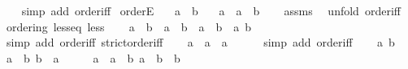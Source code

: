 \begin{isabellebody}
%
\isadelimproof
\ \ %
\endisadelimproof
%
\isatagproof
{}\isamarkupfalse%
\ {\isacharparenleft}{\kern0pt}simp\ add{\isacharcolon}{\kern0pt}\ order{\isacharunderscore}{\kern0pt}iff{\isacharparenright}{\kern0pt}%
\endisatagproof
{\isafoldproof}%
%
\isadelimproof
\isanewline
%
\endisadelimproof
\isanewline
{}\isamarkupfalse%
\ orderE{\isacharcolon}{\kern0pt}\isanewline
\ \ \ {\isachardoublequoteopen}a\ \isactrlbold {\isasymle}\ b{\isachardoublequoteclose}\isanewline
\ \ \ {\isachardoublequoteopen}a\ {\isacharequal}{\kern0pt}\ a\ \isactrlbold {\isacharasterisk}{\kern0pt}\ b{\isachardoublequoteclose}\isanewline
%
\isadelimproof
\ \ %
\endisadelimproof
%
\isatagproof
{}\isamarkupfalse%
\ assms\ \isamarkupfalse%
\ {\isacharparenleft}{\kern0pt}unfold\ order{\isacharunderscore}{\kern0pt}iff{\isacharparenright}{\kern0pt}%
\endisatagproof
{\isafoldproof}%
%
\isadelimproof
\isanewline
%
\endisadelimproof
\isanewline
{}\isamarkupfalse%
\ ordering\ less{\isacharunderscore}{\kern0pt}eq\ less\isanewline
%
\isadelimproof
%
\endisadelimproof
%
\isatagproof
{}\isamarkupfalse%
\isanewline
\ \ \isamarkupfalse%
\ {\isachardoublequoteopen}a\ \isactrlbold {\isacharless}{\kern0pt}\ b\ {\isasymlongleftrightarrow}\ a\ \isactrlbold {\isasymle}\ b\ {\isasymand}\ a\ {\isasymnoteq}\ b{\isachardoublequoteclose}\ \ a\ b\isanewline
\ \ \ \ \isamarkupfalse%
\ {\isacharparenleft}{\kern0pt}simp\ add{\isacharcolon}{\kern0pt}\ order{\isacharunderscore}{\kern0pt}iff\ strict{\isacharunderscore}{\kern0pt}order{\isacharunderscore}{\kern0pt}iff{\isacharparenright}{\kern0pt}\isanewline
{}\isamarkupfalse%
\isanewline
\ \ \isamarkupfalse%
\ {\isachardoublequoteopen}a\ \isactrlbold {\isasymle}\ a{\isachardoublequoteclose}\ \ a\isanewline
\ \ \ \ \isamarkupfalse%
\ {\isacharparenleft}{\kern0pt}simp\ add{\isacharcolon}{\kern0pt}\ order{\isacharunderscore}{\kern0pt}iff{\isacharparenright}{\kern0pt}\isanewline
{}\isamarkupfalse%
\isanewline
\ \ \isamarkupfalse%
\ a\ b\isanewline
\ \ \isamarkupfalse%
\ {\isachardoublequoteopen}a\ \isactrlbold {\isasymle}\ b{\isachardoublequoteclose}\ {\isachardoublequoteopen}b\ \isactrlbold {\isasymle}\ a{\isachardoublequoteclose}\isanewline
\ \ \isamarkupfalse%
\ \isamarkupfalse%
\ {\isachardoublequoteopen}a\ {\isacharequal}{\kern0pt}\ a\ \isactrlbold {\isacharasterisk}{\kern0pt}\ b{\isachardoublequoteclose}\ {\isachardoublequoteopen}a\ \isactrlbold {\isacharasterisk}{\kern0pt}\ b\ {\isacharequal}{\kern0pt}\ b{\isachardoublequoteclose}\isanewline

\end{isabellebody}
